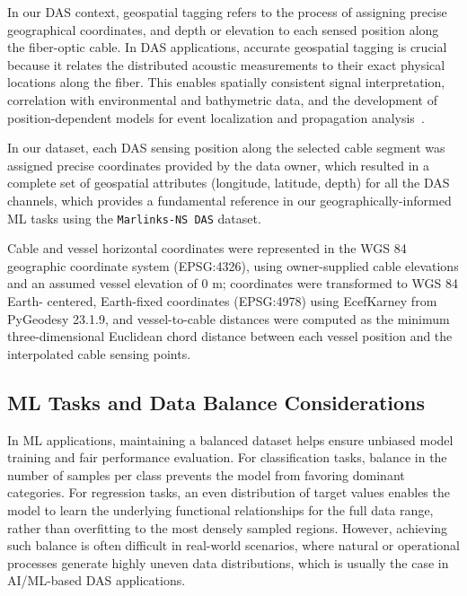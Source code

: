 \documentclass[11pt]{article}
\begin{document}
In our DAS context, geospatial tagging refers to the process of assigning precise geographical coordinates, and depth or elevation to each sensed position along the fiber-optic cable. In DAS applications, accurate geospatial tagging is crucial because it relates the distributed acoustic measurements to their exact physical locations along the fiber. This enables spatially consistent signal interpretation, correlation with environmental and bathymetric data, and the development of position-dependent models for event localization and propagation analysis~\cite{holman2025}.

In our dataset, each DAS sensing position along the selected cable segment was assigned precise coordinates provided by the data owner, which resulted in a complete set of geospatial attributes (longitude, latitude, depth) for all the DAS channels, which provides a fundamental reference in our geographically-informed ML tasks using the \texttt{Marlinks-NS DAS} dataset.

Cable and vessel horizontal coordinates were represented in the WGS 84 geographic coordinate system (EPSG:4326), using owner-supplied cable elevations and an assumed vessel elevation of 0 m; coordinates were transformed to WGS 84 Earth- centered, Earth-fixed coordinates (EPSG:4978) using EcefKarney from PyGeodesy 23.1.9, and vessel-to-cable distances were computed as the minimum three-dimensional Euclidean chord distance between each vessel position and the interpolated cable sensing points.



\subsection{ML Tasks and Data Balance Considerations}
\label{sec:ml-tasks}

In ML applications, maintaining a balanced dataset helps ensure unbiased model training and fair performance evaluation. For classification tasks, balance in the number of samples per class prevents the model from favoring dominant categories. For regression tasks, an even distribution of target values enables the model to learn the underlying functional relationships for the full data range, rather than overfitting to the most densely sampled regions. However, achieving such balance is often difficult in real-world scenarios, where natural or operational processes generate highly uneven data distributions, which is usually the case in AI/ML-based DAS applications.
\end{document}
